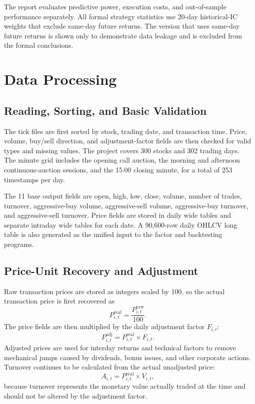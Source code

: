 \documentclass[a4paper,11pt,openany]{report}
\begin{document}
\noindent The report evaluates predictive power, execution costs, and out-of-sample performance separately. All formal strategy statistics use 20-day historical-IC weights that exclude same-day future returns. The version that uses same-day future returns is shown only to demonstrate data leakage and is excluded from the formal conclusions.

\chapter{Data Processing}

\section{Reading, Sorting, and Basic Validation}

The tick files are first sorted by stock, trading date, and transaction time. Price, volume, buy/sell direction, and adjustment-factor fields are then checked for valid types and missing values. The project covers 300 stocks and 302 trading days. The minute grid includes the opening call auction, the morning and afternoon continuous-auction sessions, and the 15:00 closing minute, for a total of 253 timestamps per day.

The 11 base output fields are open, high, low, close, volume, number of trades, turnover, aggressive-buy volume, aggressive-sell volume, aggressive-buy turnover, and aggressive-sell turnover. Price fields are stored in daily wide tables and separate intraday wide tables for each date. A 90,600-row daily OHLCV long table is also generated as the unified input to the factor and backtesting programs.

\section{Price-Unit Recovery and Adjustment}

Raw transaction prices are stored as integers scaled by 100, so the actual transaction price is first recovered as
\begin{equation}
P^{\mathrm{real}}_{i,t}=\frac{P^{\mathrm{raw}}_{i,t}}{100}.
\end{equation}
The price fields are then multiplied by the daily adjustment factor $F_{i,t}$:
\begin{equation}
P^{\mathrm{adj}}_{i,t}=P^{\mathrm{real}}_{i,t}\times F_{i,t}.
\end{equation}
Adjusted prices are used for interday returns and technical factors to remove mechanical jumps caused by dividends, bonus issues, and other corporate actions. Turnover continues to be calculated from the actual unadjusted price:
\begin{equation}
A_{i,t}=P^{\mathrm{real}}_{i,t}\times V_{i,t},
\end{equation}
because turnover represents the monetary value actually traded at the time and should not be altered by the adjustment factor.
\end{document}
